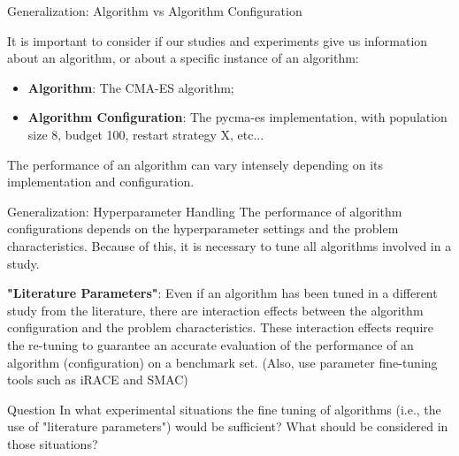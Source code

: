 \documentclass[aspectratio=169]{beamer}
\begin{document}
\begin{frame}[t]{Generalization: Algorithm vs Algorithm Configuration}

  It is important to consider if our studies and experiments give us information about an algorithm, or about a specific instance of an algorithm:\medskip

  \begin{itemize}
    \item {\bf Algorithm}: The CMA-ES algorithm;
    \item {\bf Algorithm Configuration}: The pycma-es implementation, with population size 8, budget 100, restart strategy X, etc... 
  \end{itemize}\bigskip 

  The performance of an algorithm can vary intensely depending on its implementation and configuration.
  
\end{frame}

\begin{frame}[t]{Generalization: Hyperparameter Handling}
  The performance of algorithm configurations depends on the hyperparameter settings and the problem characteristics. Because of this, it is necessary to tune all algorithms involved in a study.\bigskip 

  {\bf "Literature Parameters"}: Even if an algorithm has been tuned in a different study from the literature, there are interaction effects between the algorithm configuration and the problem characteristics. These interaction effects require the re-tuning to guarantee an accurate evaluation of the performance of an algorithm (configuration) on a benchmark set. (Also, use parameter fine-tuning tools such as iRACE and SMAC)\bigskip

  \begin{exampleblock}{Question}
    In what experimental situations the fine tuning of algorithms (i.e., the use of "literature parameters") would be sufficient? What should be considered in those situations?
  \end{exampleblock}
\end{frame}
\end{document}
